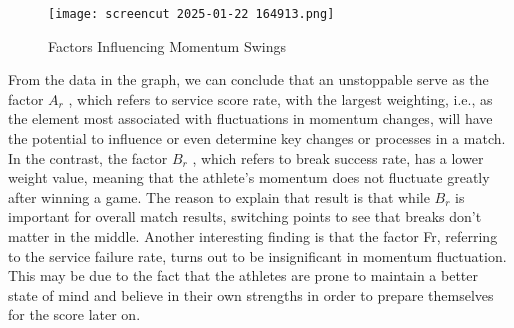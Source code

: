 \documentclass{mcmthesis}
\begin{document}
    \begin{figure}[H]
        \centering
        \texttt{[image: screencut 2025-01-22 164913.png]}
        \caption{Factors Influencing Momentum Swings} \label{Figure 22}
    \end{figure}
    
    From the data in the graph, we can conclude that an unstoppable serve as the factor $A_{r}$
    , which
    refers to service score rate, with the largest weighting, i.e., as the element most associated with
    fluctuations in momentum changes, will have the potential to influence or even determine key
    changes or processes in a match. In the contrast, the factor $B_{r}$
    , which refers to break success rate, has a lower weight value, meaning that the athlete's momentum does not fluctuate greatly after
    winning a game. The reason to explain that result is that while $B_{r}$
    is important for overall match
    results, switching points to see that breaks don't matter in the middle. Another interesting finding
    is that the factor Fr, referring to the service failure rate, turns out to be insignificant in momentum
    fluctuation. This may be due to the fact that the athletes are prone to maintain a better state of    mind and believe in their own strengths in order to prepare themselves for the score later on.
\end{document}
